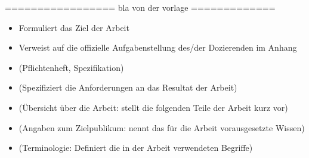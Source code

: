 ================= bla von der vorlage =============
\begin{itemize}
\item Formuliert das Ziel der Arbeit
\item Verweist auf die offizielle Aufgabenstellung des/der Dozierenden im Anhang
\item (Pflichtenheft, Spezifikation)
\item (Spezifiziert die Anforderungen an das Resultat der Arbeit)
\item (Übersicht über die Arbeit: stellt die folgenden Teile der Arbeit kurz vor)
\item (Angaben zum Zielpublikum: nennt das für die Arbeit vorausgesetzte Wissen)
\item (Terminologie: Definiert die in der Arbeit verwendeten Begriffe)
\end{itemize}
